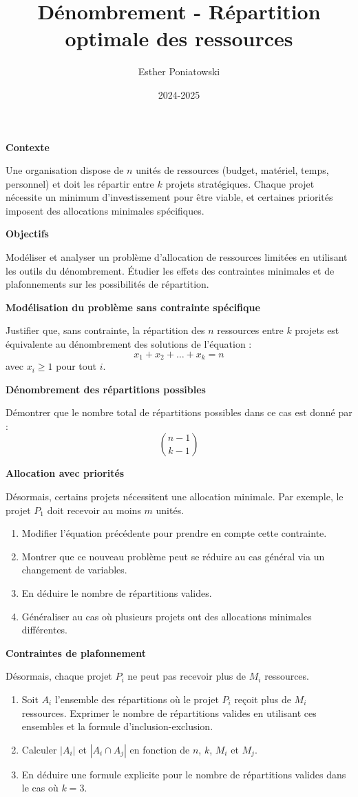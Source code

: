 \documentclass[10pt,a4paper]{article}
\title{Dénombrement - Répartition optimale des ressources}
\author{Esther Poniatowski}
\date{2024-2025}
\begin{document}
\textbf{Contexte}

Une organisation dispose de \textbf{\( n \)} unités de ressources (budget, matériel, temps,
personnel) et doit les répartir entre \textbf{\( k \)} projets stratégiques. Chaque projet nécessite
un minimum d'investissement pour être viable, et certaines priorités imposent des allocations
minimales spécifiques.

\textbf{Objectifs}

Modéliser et analyser un problème d'allocation de ressources limitées en utilisant les outils du
dénombrement. Étudier les effets des contraintes minimales et de plafonnements sur les possibilités
de répartition.

\q \textbf{Modélisation du problème sans contrainte spécifique}

   Justifier que, sans contrainte, la répartition des \( n \) ressources entre \( k \) projets est
   équivalente au dénombrement des solutions de l'équation :
   \[
   x_1 + x_2 + \dots + x_k = n
   \]
   avec \( x_i \geq 1 \) pour tout \( i \).

\q \textbf{Dénombrement des répartitions possibles}

   Démontrer que le nombre total de répartitions possibles dans ce cas est donné par :
   \[
   \binom{n-1}{k-1}
   \]

\q \textbf{Allocation avec priorités}

   Désormais, certains projets nécessitent une allocation minimale. Par exemple, le projet \( P_1 \)
   doit recevoir au moins $m$ unités.

   \begin{enumerate}
       \item Modifier l'équation précédente pour prendre en compte cette contrainte.
       \item Montrer que ce nouveau problème peut se réduire au cas général via un changement de
       variables.
       \item En déduire le nombre de répartitions valides.
       \item Généraliser au cas où plusieurs projets ont des allocations minimales différentes.
   \end{enumerate}

\q \textbf{Contraintes de plafonnement}

   Désormais, chaque projet $P_i$ ne peut pas recevoir plus de $M_i$ ressources.

   \begin{enumerate}
      \item Soit $A_i$ l'ensemble des répartitions où le projet $P_i$ reçoit plus de $M_i$
      ressources. Exprimer le nombre de répartitions valides en utilisant ces ensembles et la
      formule d'inclusion-exclusion.
      \item Calculer $|A_i|$ et $|A_i \cap A_j|$ en fonction de $n$, $k$, $M_i$ et $M_j$.
      \item En déduire une formule explicite pour le nombre de répartitions valides dans le cas où
      $k=3$.
   \end{enumerate}
\end{document}
